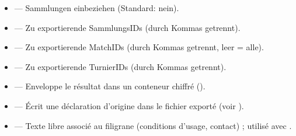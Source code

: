 \documentclass[letterpaper,10pt,german]{sphinxmanual}
\begin{document}
\begin{itemize}
\item {} 
\sphinxAtStartPar
{} — Sammlungen einbeziehen (Standard: nein).

\item {} 
\sphinxAtStartPar
{} — Zu exportierende Sammlungs\sphinxhyphen{}IDs (durch Kommas getrennt).

\item {} 
\sphinxAtStartPar
{} — Zu exportierende Match\sphinxhyphen{}IDs (durch Kommas getrennt, leer = alle).

\item {} 
\sphinxAtStartPar
{} — Zu exportierende Turnier\sphinxhyphen{}IDs (durch Kommas getrennt).

\item {} 
\sphinxAtStartPar
{} — Enveloppe le résultat dans un conteneur chiffré ().

\item {} 
\sphinxAtStartPar
{} — Écrit une déclaration d’origine  dans le fichier
exporté (voir {\hyperref[\detokenize{manuel:diffusion-controlee}]{}}).

\item {} 
\sphinxAtStartPar
{} — Texte libre associé au filigrane (conditions
d’usage, contact) ; utilisé avec .

\end{itemize}

\sphinxAtStartPar
{}
\end{document}
